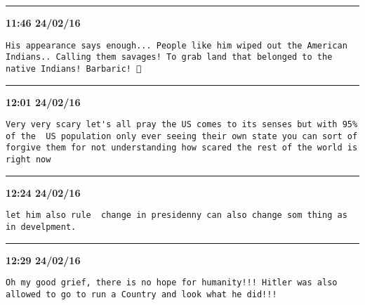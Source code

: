 \hrule%

\begin{adjustwidth}{0cm}{0cm}
\footnotesize \textbf{11:46 24/02/16}

\begin{lstlisting}[breaklines, breakatwhitespace, basicstyle=\small, frame=leftline]
His appearance says enough... People like him wiped out the American Indians.. Calling them savages! To grab land that belonged to the native Indians! Barbaric! 😤
\end{lstlisting}
\end{adjustwidth}

\hrule%

\begin{adjustwidth}{0cm}{0cm}
\footnotesize \textbf{12:01 24/02/16}

\begin{lstlisting}[breaklines, breakatwhitespace, basicstyle=\small, frame=leftline]
Very very scary let's all pray the US comes to its senses but with 95% of the  US population only ever seeing their own state you can sort of forgive them for not understanding how scared the rest of the world is right now
\end{lstlisting}
\end{adjustwidth}

\hrule%

\begin{adjustwidth}{0cm}{0cm}
\footnotesize \textbf{12:24 24/02/16}

\begin{lstlisting}[breaklines, breakatwhitespace, basicstyle=\small, frame=leftline]
let him also rule  change in presidenny can also change som thing as in develpment.
\end{lstlisting}
\end{adjustwidth}

\hrule%

\begin{adjustwidth}{0cm}{0cm}
\footnotesize \textbf{12:29 24/02/16}

\begin{lstlisting}[breaklines, breakatwhitespace, basicstyle=\small, frame=leftline]
Oh my good grief, there is no hope for humanity!!! Hitler was also allowed to go to run a Country and look what he did!!!
\end{lstlisting}
\end{adjustwidth}

